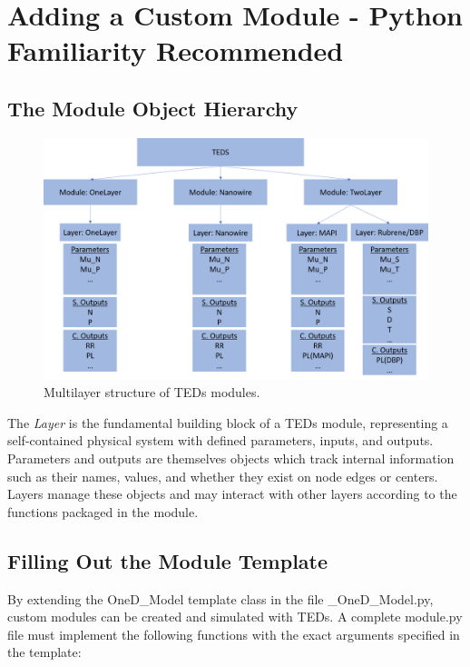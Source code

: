 \documentclass[11pt,letterpaper,titlepage]{article}
\begin{document}
	\newpage
	\section{Adding a Custom Module - Python Familiarity Recommended}
	
		\subsection{The Module Object Hierarchy}
	
		\begin{figure}[H]
			\label{fig:py_hierarchy}
			\centering
			\includegraphics[scale=0.4]{py_object_hierarchy.png}
			\caption{Multilayer structure of TEDs modules.}
		\end{figure}
	
		\par The \textit{Layer} is the fundamental building block of a TEDs module, representing a self-contained physical system with defined parameters, inputs, and outputs. Parameters and outputs are themselves objects which track internal information such as their names, values, and whether they exist on node edges or centers. Layers manage these objects and may interact with other layers according to the functions packaged in the module.
		
		\subsection{Filling Out the Module Template}
		
		\par By extending the OneD\_Model template class in the file \_OneD\_Model.py, custom modules can be created and simulated with TEDs. A complete module.py file must implement the following functions with the exact arguments specified in the template:
		
\end{document}
